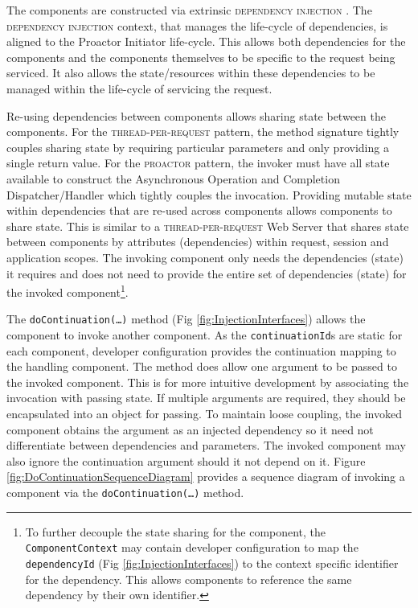 \documentclass[prodmode]{style/acmlarge}
\begin{document}
The components are constructed via extrinsic \textsc{dependency injection}
\cite{ioc}. The \textsc{dependency injection} context, that manages the
life-cycle of dependencies, is aligned to the Proactor Initiator life-cycle.
This allows both dependencies for the components and the components themselves
to be specific to the request being serviced.  It also allows the
state/resources within these dependencies to be managed within the life-cycle of
servicing the request.

Re-using dependencies between components allows sharing state between the
components.  For the \textsc{thread-per-request} pattern, the method signature
tightly couples sharing state by requiring particular parameters and only
providing a single return value.  For the \textsc{proactor} pattern, the invoker
must have all state available to construct the Asynchronous Operation and
Completion Dispatcher/Handler which tightly couples the invocation.  Providing
mutable state within dependencies that are re-used across components allows
components to share state.  This is similar to a \textsc{thread-per-request} Web
Server that shares state between components by attributes (dependencies) within
request, session and application scopes.  The invoking component only needs the
dependencies (state) it requires and does not need to provide the entire set of
dependencies (state) for the invoked component\footnote{To further decouple the
state sharing for the component, the \texttt{ComponentContext} may contain
developer configuration to map the \texttt{dependencyId} (Fig
\ref{fig:InjectionInterfaces}) to the context specific identifier for the
dependency. This allows components to reference the same dependency by their own
identifier.}.

The \texttt{doContinuation(\ldots)} method (Fig \ref{fig:InjectionInterfaces})
allows the component to invoke another component.  As the
\texttt{continuationId}s are static for each component, developer configuration
provides the continuation mapping to the handling component.  The method does
allow one argument to be passed to the invoked component.  This is for more
intuitive development by associating the invocation with passing state.  If
multiple arguments are required, they should be encapsulated into an object for
passing.  To maintain loose coupling, the invoked component obtains the argument
as an injected dependency so it need not differentiate between dependencies and
parameters.  The invoked component may also ignore the continuation argument
should it not depend on it.  Figure \ref{fig:DoContinuationSequenceDiagram}
provides a sequence diagram of invoking a component via the
\texttt{doContinuation(\ldots)} method.
\end{document}
